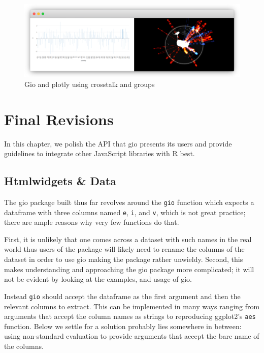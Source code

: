 \documentclass[
]{krantz}
\begin{document}
\begin{figure}[t]

{\centering \includegraphics[width=1\linewidth]{images/crosstalk-gio-2} 

}

\caption{Gio and plotly using crosstalk and groups}\label{fig:crosstalk-gio-2}
\end{figure}

\hypertarget{widgets-final}{%
\chapter{Final Revisions}\label{widgets-final}}

In this chapter, we polish the API that gio presents its users and provide guidelines to integrate other JavaScript libraries with R best.

\hypertarget{widgets-final-data}{%
\section{Htmlwidgets \& Data}\label{widgets-final-data}}

The gio package built thus far revolves around the \texttt{gio} function which expects a dataframe with three columns named \texttt{e}, \texttt{i}, and \texttt{v}, which is not great practice; there are ample reasons why very few functions do that.

First, it is unlikely that one comes across a dataset with such names in the real world thus users of the package will likely need to rename the columns of the dataset in order to use gio making the package rather unwieldy. Second, this makes understanding and approaching the gio package more complicated; it will not be evident by looking at the examples, and usage of gio.

Instead \texttt{gio} should accept the dataframe as the first argument and then the relevant columns to extract. This can be implemented in many ways ranging from arguments that accept the column names as strings to reproducing ggplot2's \texttt{aes} function. Below we settle for a solution probably lies somewhere in between: using non-standard evaluation to provide arguments that accept the bare name of the columns.
\end{document}
